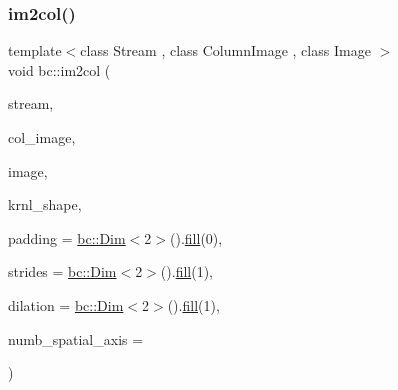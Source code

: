 \mbox{\label{namespacebc_a92b9689f9fa30f3a6342800888b7cd3b}} 
\subsubsection{\texorpdfstring{im2col()}{im2col()}}
{\footnotesize\ttfamily template$<$class Stream , class Column\+Image , class Image $>$ \\
void bc\+::im2col (\begin{DoxyParamCaption}\item[{\hyperlink{classbc_1_1streams_1_1Stream}{Stream}}]{stream,  }\item[{Column\+Image}]{col\+\_\+image,  }\item[{Image}]{image,  }\item[{\hyperlink{structbc_1_1Dim}{bc\+::\+Dim}$<$ 3 $>$}]{krnl\+\_\+shape,  }\item[{\hyperlink{structbc_1_1Dim}{bc\+::\+Dim}$<$ 2 $>$}]{padding = {\ttfamily \hyperlink{structbc_1_1Dim}{bc\+::\+Dim}$<$2$>$().\hyperlink{tensor__iteralgos_8h_afd10a40f252abd24d1faa2752becdd53}{fill}(0)},  }\item[{\hyperlink{structbc_1_1Dim}{bc\+::\+Dim}$<$ 2 $>$}]{strides = {\ttfamily \hyperlink{structbc_1_1Dim}{bc\+::\+Dim}$<$2$>$().\hyperlink{tensor__iteralgos_8h_afd10a40f252abd24d1faa2752becdd53}{fill}(1)},  }\item[{\hyperlink{structbc_1_1Dim}{bc\+::\+Dim}$<$ 2 $>$}]{dilation = {\ttfamily \hyperlink{structbc_1_1Dim}{bc\+::\+Dim}$<$2$>$().\hyperlink{tensor__iteralgos_8h_afd10a40f252abd24d1faa2752becdd53}{fill}(1)},  }\item[{int}]{numb\+\_\+spatial\+\_\+axis = {} }\end{DoxyParamCaption})}

\mbox{\label{namespacebc_ad90d6df9bf2db4ea2cfaaeb347a12634}} 
